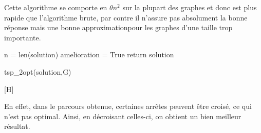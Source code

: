 \documentclass{report}
\begin{document}
  Cette algorithme se comporte en $\theta n^2$ sur la plupart des graphes et donc est plus rapide que l'algorithme brute, par contre il n'assure pas absolument la bonne réponse mais une bonne approximationpour les graphes d'une taille trop importante.\\
  \newline
  \begin{algorithm}[H]
    \SetAlgoLined
    n = len(solution)\;
    amelioration = True\;
    \;
    return solution\;
    \caption{tsp\_2opt(solution,G)}
  \end{algorithm}[H]

  En effet, dans le parcours obtenue, certaines arrêtes peuvent être croisé, ce qui n'est pas optimal. Ainsi, en décroisant celles-ci, on obtient un bien meilleur résultat.
\end{document}
